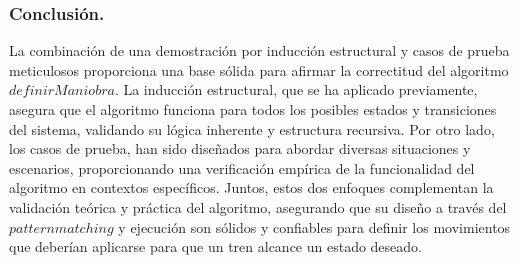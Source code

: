 \documentclass[12pt, a4paper]{article}
\begin{document}
\subsubsection{Conclusión.}
La combinación de una demostración por inducción estructural y casos de prueba meticulosos proporciona una base sólida para afirmar la correctitud del algoritmo $definirManiobra$. La inducción estructural, que se ha aplicado previamente, asegura que el algoritmo funciona para todos los posibles estados y transiciones del sistema, validando su lógica inherente y estructura recursiva. Por otro lado, los casos de prueba, han sido diseñados para abordar diversas situaciones y escenarios, proporcionando una verificación empírica de la funcionalidad del algoritmo en contextos específicos. Juntos, estos dos enfoques complementan la validación teórica y práctica del algoritmo, asegurando que su diseño a través del $pattern matching$ y ejecución son sólidos y confiables para definir los movimientos que deberían aplicarse para que un tren alcance un estado deseado.
\end{document}
